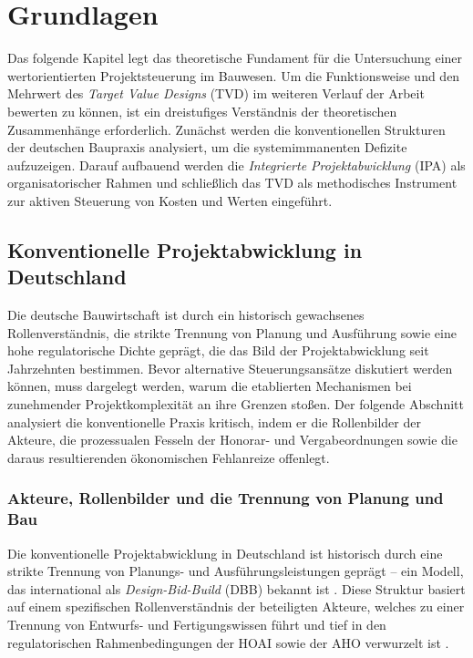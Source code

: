 \chapter{Grundlagen}
\label{ch:2}

Das folgende Kapitel legt das theoretische Fundament für die Untersuchung einer wertorientierten Projektsteuerung im Bauwesen. Um die Funktionsweise und den Mehrwert des \textit{Target Value Designs} (\acs{TVD}) im weiteren Verlauf der Arbeit bewerten zu können, ist ein dreistufiges Verständnis der theoretischen Zusammenhänge erforderlich. Zunächst werden die konventionellen Strukturen der deutschen Baupraxis analysiert, um die systemimmanenten Defizite aufzuzeigen. Darauf aufbauend werden die \textit{Integrierte Projektabwicklung} (\acs{IPA}) als organisatorischer Rahmen und schließlich das \acs{TVD} als methodisches Instrument zur aktiven Steuerung von Kosten und Werten eingeführt.

\section{Konventionelle Projektabwicklung in Deutschland}
\label{sec:2.1}

Die deutsche Bauwirtschaft ist durch ein historisch gewachsenes Rollenverständnis, die strikte Trennung von Planung und Ausführung sowie eine hohe regulatorische Dichte geprägt, die das Bild der Projektabwicklung seit Jahrzehnten bestimmen. Bevor alternative Steuerungsansätze diskutiert werden können, muss dargelegt werden, warum die etablierten Mechanismen bei zunehmender Projektkomplexität an ihre Grenzen stoßen. Der folgende Abschnitt analysiert die konventionelle Praxis kritisch, indem er die Rollenbilder der Akteure, die prozessualen Fesseln der Honorar- und Vergabeordnungen sowie die daraus resultierenden ökonomischen Fehlanreize offenlegt.

\subsection{Akteure, Rollenbilder und die Trennung von Planung und Bau}
\label{sec:2.1.1}

Die konventionelle Projektabwicklung in Deutschland ist historisch durch eine strikte Trennung von Planungs- und Ausführungsleistungen geprägt – ein Modell, das international als \textit{Design-Bid-Build} (DBB) bekannt ist \autocite[Vgl.][S.~435]{girmscheid_projektabwicklung_2016}. Diese Struktur basiert auf einem spezifischen Rollenverständnis der beteiligten Akteure, welches zu einer Trennung von Entwurfs- und Fertigungswissen führt \autocite[Vgl.][S.~12]{sommer_projektmanagement_2016} und tief in den regulatorischen Rahmenbedingungen der \acs{HOAI} sowie der \acs{AHO} verwurzelt ist \autocite[Vgl.][S.~43 ff]{girmscheid_projektabwicklung_2016}.

